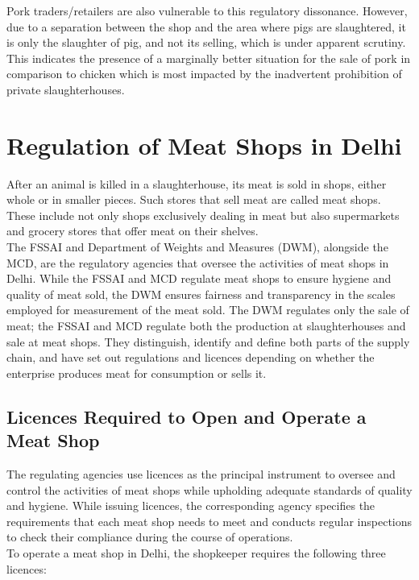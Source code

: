 \documentclass[a4paper, 12pt]{article}
\begin{document}
Pork traders/retailers are also vulnerable to this regulatory dissonance. However, due to a separation between the shop and the area where pigs are slaughtered, it is only the slaughter of pig, and not its selling, which is under apparent scrutiny. This indicates the presence of a marginally better situation for the sale of pork in comparison to chicken which is most impacted by the inadvertent prohibition of private slaughterhouses. 

\section{Regulation of Meat Shops in Delhi}

After an animal is killed in a slaughterhouse, its meat is sold in shops, either whole or in smaller pieces. Such stores that sell meat are called meat shops. These include not only shops exclusively dealing in meat but also supermarkets and grocery stores that offer meat on their shelves.\\

The FSSAI and Department of Weights and Measures (DWM), alongside the MCD, are the regulatory agencies that oversee the activities of meat shops in Delhi. While the FSSAI and MCD regulate meat shops to ensure hygiene and quality of meat sold, the DWM ensures fairness and transparency in the scales employed for measurement of the meat sold. The DWM regulates only the sale of meat; the FSSAI and MCD regulate both the production at slaughterhouses and sale at meat shops. They distinguish, identify and define both parts of the supply chain, and have set out regulations and licences depending on whether the enterprise produces meat for consumption or sells it. 

\subsection{Licences Required to Open and Operate a Meat Shop}

The regulating agencies use licences as the principal instrument to oversee and control the activities of meat shops while upholding adequate standards of quality and hygiene. While issuing licences, the corresponding agency specifies the requirements that each meat shop needs to meet and conducts regular inspections to check their compliance during the course of operations. \\

To operate a meat shop in Delhi, the shopkeeper requires the following three licences:
\end{document}
